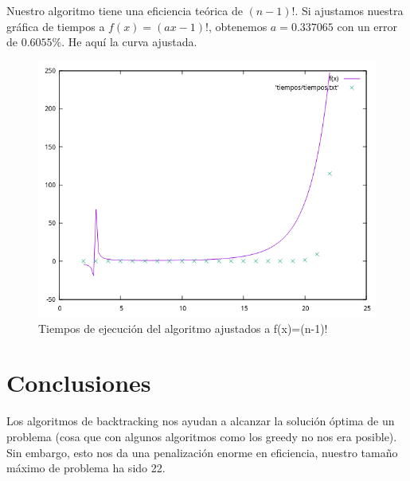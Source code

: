 \documentclass{article}
\begin{document}
	Nuestro algoritmo tiene una eficiencia teórica de $(n-1)!$. Si ajustamos nuestra gráfica de tiempos a $f(x)=(ax-1)!$, obtenemos $a=0.337065$ con un error de $0.6055\%$. He aquí la curva ajustada.
	\begin{figure}[H]
		\centering
		\includegraphics[totalheight=7cm]{ajuste}
		\caption{Tiempos de ejecución del algoritmo ajustados a f(x)=(n-1)!}
		\label{fig:eficiencia_ajustada}
	\end{figure}
	\section{Conclusiones}
	Los algoritmos de backtracking nos ayudan a alcanzar la solución óptima de un problema (cosa que con algunos algoritmos como los greedy no nos era posible). Sin embargo, esto nos da una penalización enorme en eficiencia, nuestro tamaño máximo de problema ha sido 22.
\end{document}
